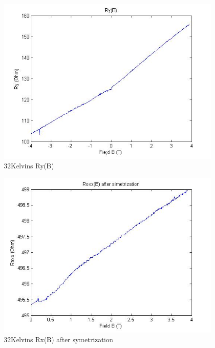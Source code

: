 \documentclass[idxtotoc,hyperref,openany,oneside]{labbook} %
\begin{document}
\begin{figure}[H] %
\begin{center}
\includegraphics[width=1\linewidth]{74632kRy(B).jpg}
\end{center}
\caption{32Kelvins Ry(B)}
\label{fig:fig11}
\end{figure}

\begin{figure}[H] %
\begin{center}
\includegraphics[width=1\linewidth]{74632kRox.jpg}
\end{center}
\caption{32Kelvins Rx(B)  after symetrization} 
\label{fig:fig12}
\end{figure}
\end{document}
